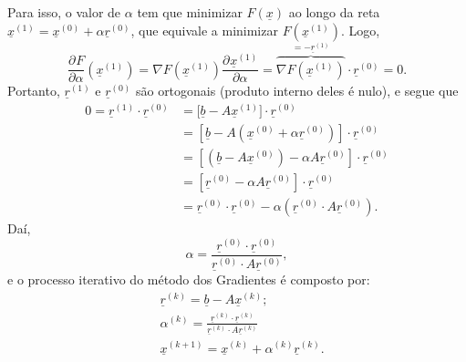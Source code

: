 \documentclass[../numerical_methods.tex]{subfiles}
\begin{document}
Para isso, o valor de \(\alpha \) tem que minimizar \(F(\underline{x})\) ao longo da reta \(\underline{x}^{(1)}=\underline{x}^{(0)} + \alpha \underline{r}^{(0)}\), que equivale a minimizar \(F(\underline{x}^{(1)})\). Logo,
\[
	\frac{\partial^{}F}{\partial \alpha ^{}}(\underline{x}^{(1)})=\nabla F(\underline{x}^{(1)}) \frac{\partial^{}\underline{x}^{(1)}}{\partial \alpha ^{}} = \overbrace{\nabla F(\underline{x}^{(1)})}^{=-\underline{r}^{(1)}}\cdot \underline{r}^{(0)}=0.
\]
Portanto, \(\underline{r}^{(1)}\) e \(\underline{r}^{(0)}\) são ortogonais (produto interno deles é nulo), e segue que
\begin{align*}
	0 = \underline{r}^{(1)}\cdot \underline{r}^{(0)} & =\biggl[\underline{b}-A\underline{x}^{(1)}\biggr]\cdot \underline{r}^{(0)}                                \\
	                                                 & =[\underline{b} - A(\underline{x}^{(0)} + \alpha \underline{r}^{(0)})]\cdot \underline{r}^{(0)}           \\
	                                                 & =[(\underline{b} - A \underline{x}^{(0)}) - \alpha A \underline{r}^{(0)}]\cdot \underline{r}^{(0)}        \\
	                                                 & =[\underline{r}^{(0)}-\alpha A \underline{r}^{(0)}]\cdot \underline{r}^{(0)}                              \\
	                                                 & =\underline{r}^{(0)}\cdot \underline{r}^{(0)} - \alpha (\underline{r}^{(0)} \cdot A \underline{r}^{(0)}).
\end{align*}
Daí,
\[
	\alpha = \frac{\underline{r}^{(0)}\cdot \underline{r}^{(0)}}{\underline{r}^{(0)}\cdot A \underline{r}^{(0)}},
\]
e o processo iterativo do método dos Gradientes é composto por:
\begin{align*}
	 & \underline{r}^{(k)} = \underline{b} - A \underline{x}^{(k)};                                                        \\
	 & \alpha ^{(k)} = \frac{\underline{r}^{(k)}\cdot \underline{r}^{(k)}}{\underline{r}^{(k)}\cdot A \underline{r}^{(k)}} \\
	 & \underline{x}^{(k+1)} = \underline{x}^{(k)} + \alpha^{(k)}\underline{r}^{(k)}.
\end{align*}
\end{document}
